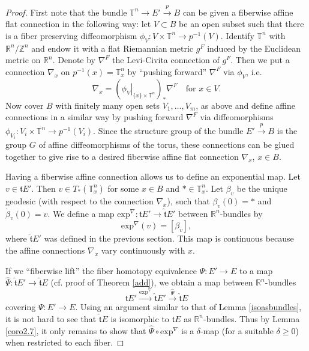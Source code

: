 \documentclass[onecolumn,notitlepage,11pt]{article}
\newcommand{\Z}{\mathbb{Z}}
\newcommand{\R}{\mathbb{R}}
\newcommand{\T}{\mathbb{T}}
\newcommand{\beq}{\begin{equation*}}
\newcommand{\eeq}{\end{equation*}}
\theoremstyle{definition}
\begin{document}
\begin{proof}
First note that the bundle $\T^n\to E'\xrightarrow{p} B$
can be given a fiberwise affine flat connection in the following way: 
let $V\subset B$ be an open subset such that there is a fiber preserving diffeomorphism 
$\phi_V:V\times\T^n\to p^{-1}(V)$. Identify $\T^n$
with $\R^n/\Z^n$ and endow it with a flat Riemannian metric
$g^F$ induced by the Euclidean metric on $\R^n$. Denote by $\nabla^F$
the Levi-Civita connection of $g^F$. Then
we put a connection $\nabla_x$ on 
$p^{-1}(x)=\T^n_x$ by ``pushing forward'' $\nabla^F$ via $\phi_V$, i.e.
\beq
\nabla_x=
\left(\left. \phi_V\right|_{\{x\}\times\T^n}\right)_*\nabla^F
\ \ \ \text{  for  } x\in V.
\eeq
Now cover $B$ with finitely many open sets $V_1,\ldots, V_m$,
as above and define affine 
connections in a similar way by pushing forward $\nabla^F$ via
diffeomorphisms 
$\phi_{V_{i}}:V_{i}\times\T^n\to p^{-1}(V_{i})$.
Since the structure group of the bundle
$E'\xrightarrow{p}B$ is the group $G$ of affine
diffeomorphisms of the torus, these connections can be glued together to
give rise to a desired fiberwise affine flat connection $\nabla_x$, 
$x\in B$.

Having a fiberwise affine connection allows us to define an 
exponential map. Let $v\in\mathfrak{t}E'$. Then $v\in T_{\ast}(\T^n_x)$
for some $x\in B$ and $\ast\in\T^n_x$. Let $\beta_v$ be the unique
geodesic (with respect to the connection $\nabla_x$), such that
$\beta_v(0)=\ast$ and $\dot{\beta}_v(0)=v$. We define a map 
$\mbox{exp}^{\nabla}:\mathfrak{t}E'\to\widehat{\mathfrak{t}}E'$
between $\R^n$-bundles by
\beq
\mbox{exp}^{\nabla}(v)=[\beta_v],
\eeq
where $\widehat{\mathfrak{t}}E'$ was defined in the previous section. This
map is continuous because the affine connections $\nabla_x$ vary 
continuously with $x$.

If we ``fiberwise lift'' the fiber homotopy equivalence $\Psi:E'\to E$
to a map
$\widehat{\Psi}:\widehat{\mathfrak{t}}E'\to\widehat{\mathfrak{t}}E$
(cf. proof of Theorem \ref{add}),
we obtain a map between $\R^n$-bundles
\beq
\mathfrak{t}E'\xrightarrow{\mbox{exp}^{\nabla}}\widehat{\mathfrak{t}}E'
\xrightarrow{\widehat{\Psi}}\widehat{\mathfrak{t}}E
\eeq
covering $\Psi:E'\to E$. 
Using an argument similar to that of Lemma \ref{isoasbundles}, it is not
hard to see that $\widehat{\mathfrak{t}}E$ is isomorphic
to $\mathfrak{t}E$ as 
$\R^n$-bundles. Thus by Lemma \ref{coro2.7}, it only remains to show
that $\widehat{\Psi}\circ\mbox{exp}^{\nabla}$ is a $\delta$-map (for a suitable
$\delta\geq 0$) when restricted to each fiber.


\end{proof}
\end{document}
